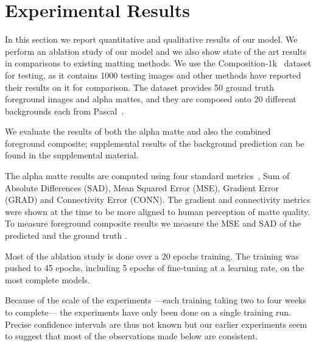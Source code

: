 \documentclass[runningheads]{llncs}
\begin{document}
\section{Experimental Results}
\label{sec:results}


In this section we report quantitative and qualitative results of our model. We perform an ablation study of our model and we also show state of the art results in comparisons to existing matting methods. 
We use the Composition-1k~\cite{DeepImageMatting} dataset for testing, as it contains 1000 testing images and other methods have reported their results on it for comparison. The dataset provides 50 ground truth foreground images and alpha mattes, and they are composed onto 20 different backgrounds each from Pascal~\cite{pascal2012}. 

We evaluate the results of both the alpha matte and also the combined  foreground composite; supplemental results of the background prediction can be found in the supplemental material. 

The alpha matte results are computed using four standard metrics~\cite{alphamattingcom}, Sum of Absolute Differences (SAD), Mean Squared Error (MSE), Gradient Error (GRAD) and Connectivity Error (CONN). The gradient and connectivity metrics were shown at the time to be more aligned to human perception of matte quality. 
To measure foreground composite results we measure the MSE and SAD of the predicted  and the ground truth .

Most of the ablation study is done over a 20 epochs training. The training was pushed to 45 epochs, including 5 epochs of fine-tuning at a  learning rate, on the most complete models. 

Because of the scale of the experiments ---each training taking two to four weeks to complete--- the experiments have only been done on a single training run. Precise confidence intervals are thus not known but our earlier experiments seem to suggest that most of the observations made below are consistent.
\end{document}
